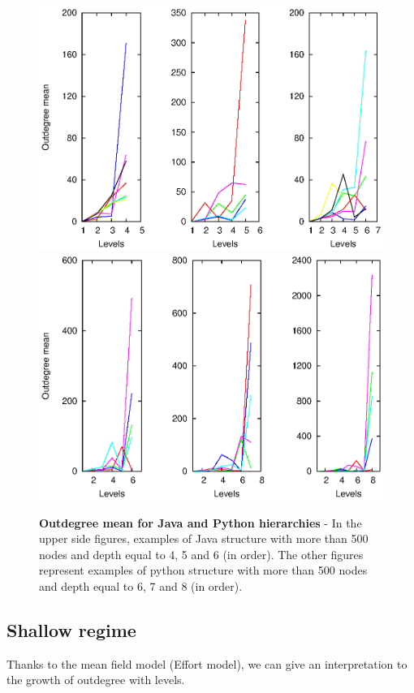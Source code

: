 \begin{figure}[hp]%
\includegraphics[width=\textwidth,draft=false]{grafici/Coutdeg.java.eps}
\includegraphics[width=\textwidth,draft=false]{grafici/Coutdeg.py.eps}
\caption{\label{Foutdegjp} \footnotesize\textbf{Outdegree mean for Java and Python hierarchies} - In the upper side figures, examples of Java structure with more than 500 nodes and depth equal to 4, 5 and 6 (in order). The other figures represent examples of python structure with more than 500 nodes and depth equal to 6, 7 and 8 (in order).}
\end{figure}

\subsection{Shallow regime}
Thanks to the mean field model (Effort model), we can give an interpretation to the growth of outdegree with levels.

